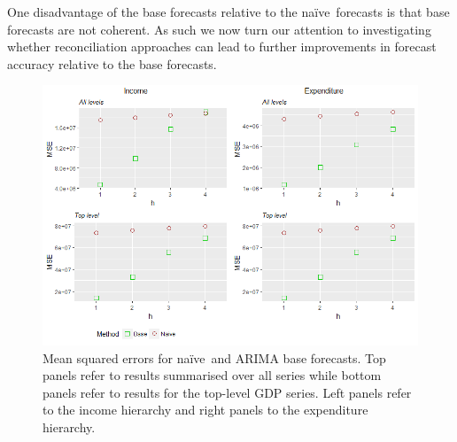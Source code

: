 \documentclass[graybox]{svmult}
\def\naive{na\"{i}ve\ }
\begin{document}
One disadvantage of the base forecasts relative to the \naive forecasts is that base forecasts are not coherent. As such we now turn our attention to investigating whether reconciliation approaches can lead to further improvements in forecast accuracy relative to the base forecasts.


\begin{figure}
	\centering
	\small
	\includegraphics[width=\textwidth]{Figs/Results/NaiveVsBase_MSE.png}
	\caption{Mean squared errors for \naive and ARIMA base forecasts. Top panels refer to results summarised over all series while bottom panels refer to results for the top-level GDP series. Left panels refer to the income hierarchy and right panels to the expenditure hierarchy.}\label{fig: NaiveVsBase_MSE}
\end{figure}

\end{document}
